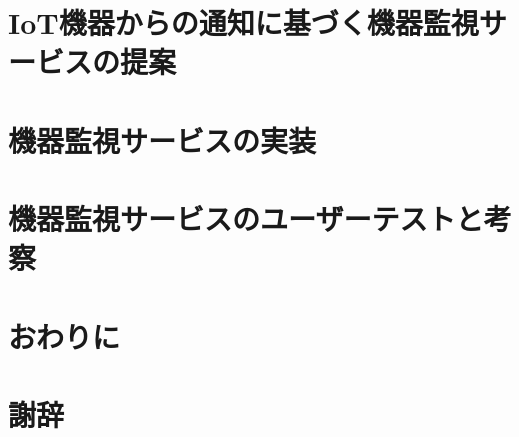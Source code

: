 \documentclass[a4paper]{jreport}
\begin{document}
\chapter{IoT機器からの通知に基づく機器監視サービスの提案}


\chapter{機器監視サービスの実装}


\chapter{機器監視サービスのユーザーテストと考察}


\chapter{おわりに}


\chapter{謝辞}



\begin{comment}
流れ
序論
・IoTが流行している。
  ->何故？
	・コンピューターの高性能化と価格の低下 -> ほんとに？
	・家庭へのインターネットの普及 -> ほんとに？
  -> ほんとに？

・IoTのデバイス監視で困っている。
  -> デバイスの監視が本当に必要なのか？
	・サービスを止めないために必要 -> ほんとに？
  -> 何故デバイスの監視で困っているのか？
	・見に行くわけに行かない。
	  ->何故？
		・設置場所が離れていることがある。-> ほんとに？
		・数が多くて見きれない。 -> ほんとに？
	・サービスに組み込むのにも手間がかかる -> ほんとに？
  -> ほんとに？

提案
・IoT機器向けの機器監視サービスを作ったら、楽になるのでは？
  -> 他の解決策はどうなの？何がダメなの？
	・Ping
	・SNMP
	・Influxdb...
	・Elasticksearch...
  -> 他のがダメなのに、コレが何故OKなの？
	・IoTサービスの開発に特化しているため
	  ->どう特化してるの？
		・グラフ作成等の手間が不要
		・一覧して見ることができる
		・機器から通知が送られてくるので、NAPTで突っかからない。
  -> ほんとに？=>検証へ

検証
・田頭さんの研究で使ってもらい評価を得る。
　1. 使い方について簡単に説明
　2. 使っている様子を観測
  3. 最後に聞き取りを実施
-> なんだって？
　・こんな意見が聞けた。
　・サービスについては、〇〇だと言われた。
　・観察している中で、こんな所が気になった。

結論
・確かに楽になった or 楽にならなかった。
 -> 何故？

今後の課題としてこんなことがあった。
 ・
\end{comment}
\end{document}
